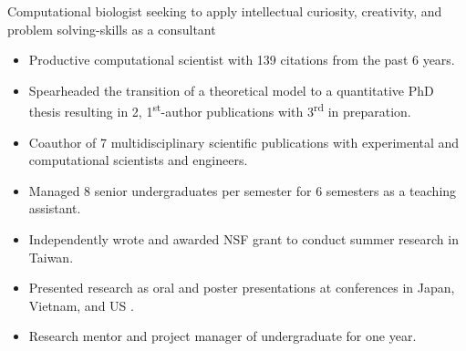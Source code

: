 

\begin{cventries}
\vspace{-4.0mm}

  \cventry
    {} %
    {} %
    {} %
    {} %
    {
      \begin{cvitems} %
        \item {Computational biologist seeking to apply intellectual curiosity, creativity, and problem solving-skills as a consultant}
        \begin{itemize}
        	\item Productive computational scientist with 139 citations from the past 6 years.
        	\item Spearheaded the transition of a theoretical model to a quantitative PhD thesis resulting in 2, 1\textsuperscript{st}-author publications with 3\textsuperscript{rd} in preparation.
        	\item Coauthor of 7 multidisciplinary scientific publications with experimental and computational scientists and engineers.
        	\item Managed 8 senior undergraduates per semester for 6 semesters as a teaching assistant.
        	\item Independently wrote and awarded NSF grant to conduct summer research in Taiwan.
       	 	\item Presented research as oral and poster presentations at conferences in Japan, Vietnam, and US  .
         	\item Research mentor and project manager of undergraduate for one year.
        \end{itemize}
      \end{cvitems}
    }
\vspace{-4.0mm}
\end{cventries}

